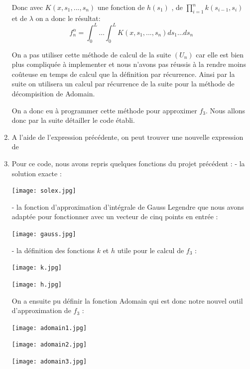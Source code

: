 \documentclass{article}
\begin{document}
\begin{enumerate}
Donc avec $K(x,s_1,...,s_n)$ une fonction de $h(s_1)$ , de $\prod_{i=1}^n k(s_{i-1},s_i)$  et de $\lambda$ on a donc le résultat:
\begin{equation}
    f_n^\alpha = \displaystyle\int_0^L \ldots \displaystyle\int_0^L K(x,s_1,...,s_n) ds_1 \ldots ds_n
\end{equation}

On a pas utiliser cette méthode de calcul de la suite $(U_n)$ car elle est bien plus compliquée à implementer et nous n'avons pas réussis à la rendre moins coûteuse en temps de calcul que la définition par récurrence. Ainsi par la suite on utilisera un calcul par récurrence de la suite pour la méthode de décompisition de Adomain.


On a donc eu à programmer cette méthode pour approximer $f_3$. Nous allons donc par la suite détailler le code établi.

\item A l'aide de l'expression précédente, on peut trouver une nouvelle expression de

\item Pour ce code, nous avons repris quelques fonctions du projet précédent : 
- la solution exacte :

{
\texttt{[image: solex.jpg]} \par}
\bigskip

- la fonction d'approximation d'intégrale de Gauss Legendre que nous avons adaptée pour fonctionner avec un vecteur de cinq points en entrée :\\

{
\texttt{[image: gauss.jpg]} \par}
\bigskip

- la définition des fonctions $k$ et $h$ utile pour le calcul de $f_3$ :\\

{
\texttt{[image: k.jpg]} \par}
\bigskip

{
\texttt{[image: h.jpg]} \par}
\bigskip

On a ensuite pu définir la fonction Adomain qui est donc notre nouvel outil d'approximation de $f_3$ :\\

{
\texttt{[image: adomain1.jpg]} \par}
\bigskip

{
\texttt{[image: adomain2.jpg]} \par}
\bigskip

{
\texttt{[image: adomain3.jpg]} \par}
\bigskip


\end{enumerate}
\end{document}
